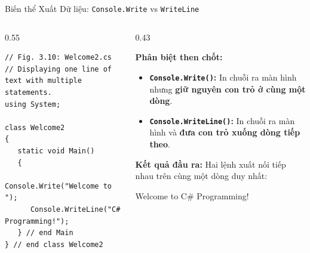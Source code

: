 \documentclass[aspectratio=169, 10pt]{beamer}
\begin{document}
\begin{frame}[fragile]{Biến thể Xuất Dữ liệu: \texttt{Console.Write} vs \texttt{WriteLine}}
  \begin{columns}[T]
    \begin{column}{0.55\textwidth}
      \begin{tcolorbox}[colback=CodeBg,colframe=UniBlue,title=\textbf{Welcome2.cs (Fig. 3.10)},fonttitle=\small\bfseries]
\begin{lstlisting}
// Fig. 3.10: Welcome2.cs
// Displaying one line of text with multiple statements.
using System;

class Welcome2
{
   static void Main()
   {
      Console.Write("Welcome to ");
      Console.WriteLine("C# Programming!");
   } // end Main
} // end class Welcome2
\end{lstlisting}
      \end{tcolorbox}
    \end{column}

    \begin{column}{0.43\textwidth}
      \begin{block}{\textbf{Phân biệt then chốt:}}
        \begin{itemize}\small
          \item \textbf{\texttt{Console.Write()}:} In chuỗi ra màn hình nhưng \textbf{giữ nguyên con trỏ ở cùng một dòng}.
          \item \textbf{\texttt{Console.WriteLine()}:} In chuỗi ra màn hình và \textbf{đưa con trỏ xuống dòng tiếp theo}.
        \end{itemize}
      \end{block}

      \begin{exampleblock}{\textbf{Kết quả đầu ra:}}
        Hai lệnh xuất nối tiếp nhau trên cùng một dòng duy nhất:
        \begin{tcolorbox}[colback=UniDark,colframe=black]
          \color{white}\ttfamily\small
          Welcome to C\# Programming!
        \end{tcolorbox}
      \end{exampleblock}
    \end{column}
  \end{columns}
\end{frame}
\end{document}
